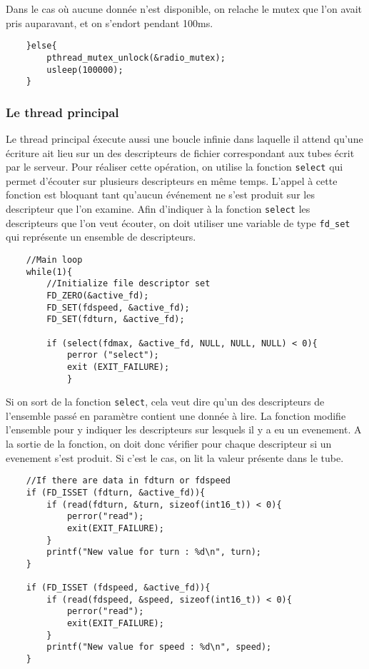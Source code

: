 Dans le cas où aucune donnée n'est disponible, on relache le mutex que l'on 
avait pris auparavant, et on s'endort pendant 100ms. \\

\begin{DDbox}{\linewidth}
\begin{lstlisting}
	}else{
		pthread_mutex_unlock(&radio_mutex);
		usleep(100000);
	}
\end{lstlisting}
\end{DDbox}

\subsubsection{Le thread principal}

Le thread principal éxecute aussi une boucle infinie dans laquelle il attend
qu'une écriture ait lieu sur un des descripteurs de fichier correspondant aux
tubes écrit par le serveur. Pour réaliser cette opération, on utilise la
fonction \texttt{select} qui permet d'écouter sur plusieurs descripteurs en même
temps. L'appel à cette fonction est bloquant tant qu'aucun événement ne s'est
produit sur les descripteur que l'on examine. Afin d'indiquer à la fonction
\texttt{select} les descripteurs que l'on veut écouter, on doit utiliser une
variable de type \texttt{fd\_set} qui représente un ensemble de descripteurs. \\

\begin{DDbox}{\linewidth}
\begin{lstlisting}
	//Main loop
	while(1){
		//Initialize file descriptor set
		FD_ZERO(&active_fd);
		FD_SET(fdspeed, &active_fd);
		FD_SET(fdturn, &active_fd);

		if (select(fdmax, &active_fd, NULL, NULL, NULL) < 0){
			perror ("select");
			exit (EXIT_FAILURE);
	        }
\end{lstlisting}
\end{DDbox}

Si on sort de la fonction \texttt{select}, cela veut dire qu'un des
descripteurs de l'ensemble passé en paramètre contient une donnée à lire.
La fonction modifie l'ensemble pour y indiquer les descripteurs sur lesquels il
y a eu un evenement. A la sortie de la fonction, on doit donc vérifier pour 
chaque descripteur si un evenement s'est produit. Si c'est le cas, on lit la 
valeur présente dans le tube. \\

\begin{DDbox}{\linewidth}
\begin{lstlisting}
	//If there are data in fdturn or fdspeed
	if (FD_ISSET (fdturn, &active_fd)){
		if (read(fdturn, &turn, sizeof(int16_t)) < 0){
			perror("read");
			exit(EXIT_FAILURE);
		}
		printf("New value for turn : %d\n", turn);
	}

	if (FD_ISSET (fdspeed, &active_fd)){
		if (read(fdspeed, &speed, sizeof(int16_t)) < 0){
			perror("read");
			exit(EXIT_FAILURE);
		}
		printf("New value for speed : %d\n", speed);
	}
\end{lstlisting}
\end{DDbox}

